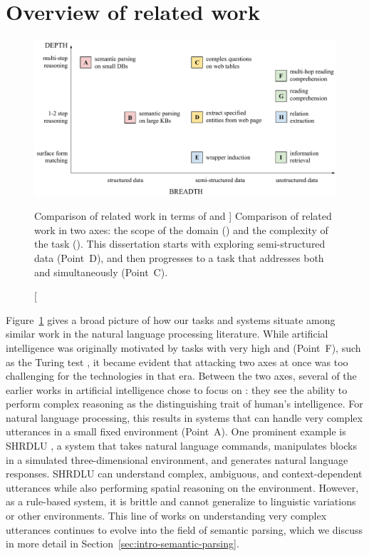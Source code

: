 
\section{Overview of related work}

\begin{figure}
\centering
\includegraphics[width=\textwidth]{figures/intro/breadth-depth.pdf}
\caption
[Comparison of related work in terms of \Breadth and \Depth]
{Comparison of related work in two axes:
the scope of the domain (\Breadth)
and the complexity of the task (\Depth).
This dissertation starts
with exploring semi-structured data
(Point~D),
and then progresses to a task that addresses
both \Breadth and \Depth
simultaneously (Point~C).}
\label{fig:depth-breadth-plot}
\end{figure}

Figure~\ref{fig:depth-breadth-plot}
gives a broad picture of how our tasks and systems
situate among similar work in the
natural language processing literature.
While artificial intelligence was originally motivated
by tasks with very high \Depth and \Breadth
(Point~F),
such as the Turing test
\cite{turing1950computing},
it became evident that attacking two axes at once
was too challenging
for the technologies in that era.
Between the two axes,
several of the earlier works in artificial intelligence chose
to focus on \Depth:
they see the ability to perform complex reasoning
as the distinguishing trait of human's intelligence.
For natural language processing,
this results in systems that can handle very complex
utterances in a small fixed environment
(Point~A).
One prominent example is
SHRDLU \cite{winograd1972language},
a system that takes natural language commands,
manipulates blocks in a simulated
three-dimensional environment,
and generates natural language responses.
SHRDLU can understand complex, ambiguous,
and context-dependent utterances
while also performing spatial reasoning on the environment.
However, as a rule-based system,
it is brittle and cannot generalize to
linguistic variations or other environments.
This line of works on understanding very complex utterances
continues to evolve into the field
of semantic parsing,
which we discuss in more detail in
Section~\ref{sec:intro-semantic-parsing}.

